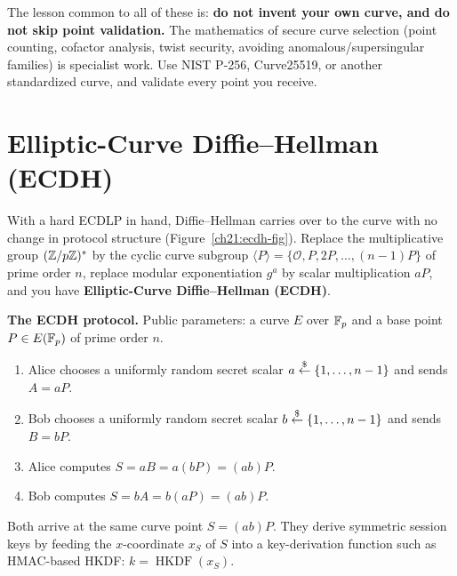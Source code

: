 \begin{trapbox}
The lesson common to all of these is: \textbf{do not invent your own curve, and do
not skip point validation.} The mathematics of secure curve selection (point counting,
cofactor analysis, twist security, avoiding anomalous/supersingular families) is
specialist work. Use NIST P-256, Curve25519, or another standardized curve, and validate
every point you receive.
\end{trapbox}

\section{Elliptic-Curve Diffie--Hellman (ECDH)}
\label{ch21:ecdh}

With a hard ECDLP in hand, Diffie--Hellman carries over to the curve with no change in
protocol structure (Figure~\ref{ch21:ecdh-fig}). Replace the multiplicative group
$(\mathbb{Z}/p\mathbb{Z})^{*}$ by the cyclic curve subgroup $\langle P\rangle = \{\mathcal{O}, P, 2P, \dots,
(n-1)P\}$ of prime order $n$, replace modular exponentiation $g^a$ by scalar
multiplication $aP$, and you have \textbf{Elliptic-Curve Diffie--Hellman (ECDH)}.

\begin{focusbox}
\textbf{The ECDH protocol.} Public parameters: a curve $E$ over $\mathbb{F}_p$ and a base point
$P \in E(\mathbb{F}_p)$ of prime order $n$.
\begin{enumerate}
  \item Alice chooses a uniformly random secret scalar $a \stackrel{\$}{\gets} \{1,\dots,n-1\}$ and
        sends $A = aP$.
  \item Bob chooses a uniformly random secret scalar $b \stackrel{\$}{\gets} \{1,\dots,n-1\}$ and
        sends $B = bP$.
  \item Alice computes $S = aB = a(bP) = (ab)P$.
  \item Bob computes $S = bA = b(aP) = (ab)P$.
\end{enumerate}
Both arrive at the same curve point $S = (ab)P$. They derive symmetric session keys by
feeding the $x$-coordinate $x_S$ of $S$ into a key-derivation function such as HMAC-based
HKDF: $k = \operatorname{HKDF}(x_S)$.
\end{focusbox}

